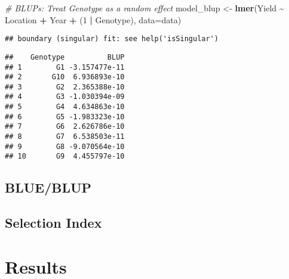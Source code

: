 \documentclass[
]{article}
\newenvironment{Shaded}{\begin{snugshade}}{\end{snugshade}}
\newcommand{\AttributeTok}[1]{\textcolor[rgb]{0.13,0.29,0.53}{#1}}
\newcommand{\CommentTok}[1]{\textcolor[rgb]{0.56,0.35,0.01}{\textit{#1}}}
\newcommand{\DecValTok}[1]{\textcolor[rgb]{0.00,0.00,0.81}{#1}}
\newcommand{\FunctionTok}[1]{\textcolor[rgb]{0.13,0.29,0.53}{\textbf{#1}}}
\newcommand{\NormalTok}[1]{#1}
\newcommand{\OtherTok}[1]{\textcolor[rgb]{0.56,0.35,0.01}{#1}}
\newcommand{\SpecialCharTok}[1]{\textcolor[rgb]{0.81,0.36,0.00}{\textbf{#1}}}
\begin{document}
\begin{Shaded}
\begin{Highlighting}[]
\CommentTok{\# BLUPs: Treat Genotype as a random effect}
\NormalTok{model\_blup }\OtherTok{\textless{}{-}} \FunctionTok{lmer}\NormalTok{(Yield }\SpecialCharTok{\textasciitilde{}}\NormalTok{ Location }\SpecialCharTok{+}\NormalTok{ Year }\SpecialCharTok{+}\NormalTok{ (}\DecValTok{1} \SpecialCharTok{|}\NormalTok{ Genotype), }\AttributeTok{data=}\NormalTok{data)}
\end{Highlighting}
\end{Shaded}

\begin{verbatim}
## boundary (singular) fit: see help('isSingular')
\end{verbatim}

\begin{Shaded}
\end{Shaded}

\begin{verbatim}
##    Genotype          BLUP
## 1        G1 -3.157477e-11
## 2       G10  6.936893e-10
## 3        G2  2.365388e-10
## 4        G3 -1.030394e-09
## 5        G4  4.634863e-10
## 6        G5 -1.983323e-10
## 7        G6  2.626786e-10
## 8        G7  6.538503e-11
## 9        G8 -9.070564e-10
## 10       G9  4.455797e-10
\end{verbatim}

\subsection{BLUE/BLUP}\label{blueblup}

\subsection{Selection Index}\label{selection-index}

\section{Results}\label{results}
\end{document}

